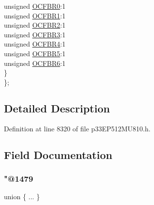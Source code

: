 \begin{DoxyCompactItemize}
\begin{tabbing}
\>\>unsigned \hyperlink{structtag_r_p_i_n_r11_b_i_t_s_ac1fee1ff2c691cfe77d50b3b80851838}{OCFBR0}:1\\
\>\>unsigned \hyperlink{structtag_r_p_i_n_r11_b_i_t_s_abcec9d9ac7af3fe66de2511af480ef70}{OCFBR1}:1\\
\>\>unsigned \hyperlink{structtag_r_p_i_n_r11_b_i_t_s_ae65c69b7d96ea301bb375823415959e8}{OCFBR2}:1\\
\>\>unsigned \hyperlink{structtag_r_p_i_n_r11_b_i_t_s_abaeace5345106623b05847171c527ba5}{OCFBR3}:1\\
\>\>unsigned \hyperlink{structtag_r_p_i_n_r11_b_i_t_s_ab8e07cf3af90690100abfa0c4ee4d7cb}{OCFBR4}:1\\
\>\>unsigned \hyperlink{structtag_r_p_i_n_r11_b_i_t_s_a97d1fcab6d03c22d9cbe0f37c4d06f55}{OCFBR5}:1\\
\>\>unsigned \hyperlink{structtag_r_p_i_n_r11_b_i_t_s_abd4aa2eb078d4e5a6dbe26be47aba471}{OCFBR6}:1\\
\>\} \\
\}; \\

\end{tabbing}\end{DoxyCompactItemize}


\subsection{Detailed Description}


Definition at line 8320 of file p33\+E\+P512\+M\+U810.\+h.



\subsection{Field Documentation}
\mbox{\label{structtag_r_p_i_n_r11_b_i_t_s_a4387d46151f0cad69a5d4a1e1b9425f6}} 
\subsubsection{\texorpdfstring{"@1479}{@1479}}
{\footnotesize\ttfamily union \{ ... \} }

\mbox{\label{structtag_r_p_i_n_r11_b_i_t_s_adf71f3d8410c1f1dbbc96680a92c49af}} 
